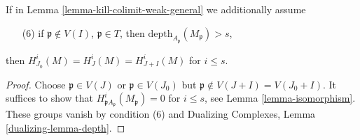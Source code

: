 \begin{lemma}
\label{lemma-kill-colimit-support-general}
If in Lemma \ref{lemma-kill-colimit-weak-general} we additionally assume
\begin{enumerate}
\item[(6)] if $\mathfrak p \not \in V(I)$, $\mathfrak p \in T$, then
$\text{depth}_{A_\mathfrak p}(M_\mathfrak p) > s$,
\end{enumerate}
then $H^i_{J_0}(M) = H^i_J(M) = H^i_{J + I}(M)$ for $i \leq s$.
\end{lemma}

\begin{proof}
Choose $\mathfrak p \in V(J)$ or $\mathfrak p \in V(J_0)$ but
$\mathfrak p \not \in V(J + I) = V(J_0 + I)$.
It suffices to show that $H^i_{\mathfrak pA_\mathfrak p}(M_\mathfrak p) = 0$
for $i \leq s$, see Lemma \ref{lemma-isomorphism}.
These groups vanish by condition (6) and
Dualizing Complexes, Lemma \ref{dualizing-lemma-depth}.
\end{proof}

